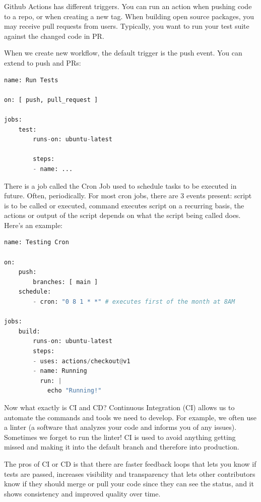 \documentclass[11pt]{article}
\begin{document}
\noindent Github Actions has different triggers. You can run an action when pushing code to a repo, or when creating a new tag. When building open source packages, you may receive pull requests from users. Typically, you want to run your test suite against the changed code in PR.

\noindent When we create new workflow, the default trigger is the push event. You can extend to push and PRs:

\begin{lstlisting}[language=python]
name: Run Tests

on: [ push, pull_request ]

jobs:
    test:
        runs-on: ubuntu-latest

        steps:
        - name: ...
\end{lstlisting}

\noindent There is a job called the Cron Job used to schedule tasks to be executed in future. Often, periodically. For most cron jobs, there are 3 events present: script is to be called or executed, command executes script on a recurring basis, the actions or output of the script depends on what the script being called does. Here's an example:

\begin{lstlisting}[language=python]
name: Testing Cron

on:
    push:
        branches: [ main ]
    schedule:
        - cron: "0 8 1 * *" # executes first of the month at 8AM

jobs:
    build:
        runs-on: ubuntu-latest
        steps:
        - uses: actions/checkout@v1
        - name: Running
          run: |
            echo "Running!"
\end{lstlisting}

\noindent Now what exactly is CI and CD? Continuous Integration (CI) allows us to automate the commands and tools we need to develop. For example, we often use a linter (a software that analyzes your code and informs you of any issues). Sometimes we forget to run the linter! CI is used to avoid anything getting missed and making it into the default branch and therefore into production.

\noindent The pros of CI or CD is that there are faster feedback loops that lets you know if tests are passed, increases visibility and transparency that lets other contributors know if they should merge or pull your code since they can see the status, and it shows consistency and improved quality over time.
\end{document}

